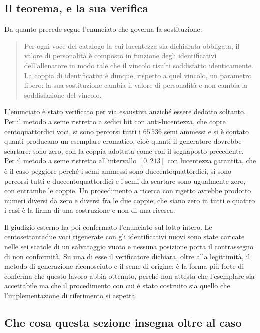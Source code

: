 \subsection{Il teorema, e la sua verifica}

Da quanto precede segue l'enunciato che governa la sostituzione:

\begin{quote}
Per ogni voce del catalogo la cui lucentezza sia dichiarata obbligata, il valore di personalità è composto in funzione degli identificativi dell'allenatore in modo tale che il vincolo risulti soddisfatto identicamente. La coppia di identificativi è dunque, rispetto a quel vincolo, un parametro libero: la sua sostituzione cambia il valore di personalità e non cambia la soddisfazione del vincolo.
\end{quote}

L'enunciato è stato verificato per via esaustiva anziché essere dedotto soltanto. Per il metodo a seme ristretto a sedici bit con anti-lucentezza, che copre centoquattordici voci, si sono percorsi tutti i $65\,536$ semi ammessi e si è contato quanti producano un esemplare cromatico, cioè quanti il generatore dovrebbe scartare: sono zero, con la coppia adottata come con il segnaposto precedente. Per il metodo a seme ristretto all'intervallo $[0,213]$ con lucentezza garantita, che è il caso peggiore perché i semi ammessi sono duecentoquattordici, si sono percorsi tutti e duecentoquattordici e i semi da scartare sono ugualmente zero, con entrambe le coppie. Un procedimento a ricerca con rigetto avrebbe prodotto numeri diversi da zero e diversi fra le due coppie; che siano zero in tutti e quattro i casi è la firma di una costruzione e non di una ricerca.

Il giudizio esterno ha poi confermato l'enunciato sul lotto intero. Le centosettantadue voci rigenerate con gli identificativi nuovi sono state caricate nelle sei scatole di un salvataggio vuoto e nessuna posizione porta il contrassegno di non conformità. Su una di esse il verificatore dichiara, oltre alla legittimità, il metodo di generazione riconosciuto e il seme di origine: è la forma più forte di conferma che questo lavoro abbia ottenuto, perché non attesta che l'esemplare sia accettabile ma che il procedimento con cui è stato costruito sia quello che l'implementazione di riferimento si aspetta.

\subsection{Che cosa questa sezione insegna oltre al caso}

